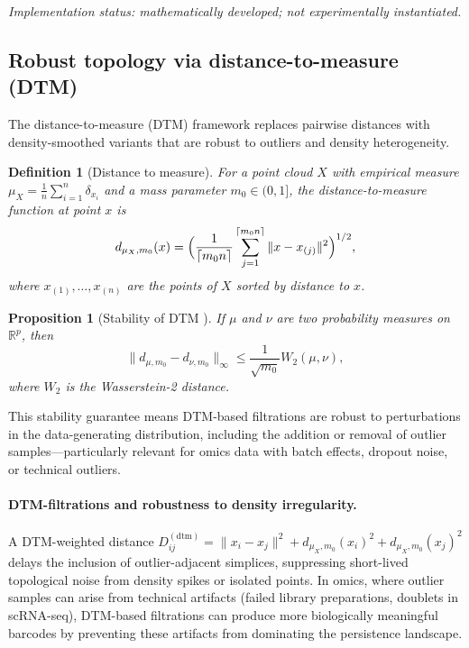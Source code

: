 \documentclass[11pt]{article}
\newtheorem{proposition}[theorem]{Proposition}
\newtheorem{definition}[theorem]{Definition}
\begin{document}
\emph{Implementation status: mathematically developed; not experimentally instantiated.}

\subsection{Robust topology via distance-to-measure (DTM)}
\label{sec:dtm}

The distance-to-measure (DTM) framework \cite{chazal2011dtm, chazal2017robust} replaces pairwise distances with density-smoothed variants that are robust to outliers and density heterogeneity.

\begin{definition}[Distance to measure]\label{def:dtm}
For a point cloud $X$ with empirical measure $\mu_X = \frac{1}{n}\sum_{i=1}^n \delta_{x_i}$ and a mass parameter $m_0 \in (0,1]$, the \emph{distance-to-measure function} at point $x$ is
\[
d_{\mu_X, m_0}(x) = \Bigl( \frac{1}{\lceil m_0 n \rceil} \sum_{j=1}^{\lceil m_0 n \rceil} \|x - x_{(j)}\|^2 \Bigr)^{1/2},
\]
where $x_{(1)}, \ldots, x_{(n)}$ are the points of $X$ sorted by distance to $x$.
\end{definition}

\begin{proposition}[Stability of DTM \cite{chazal2011dtm}]\label{prop:dtm}
If $\mu$ and $\nu$ are two probability measures on $\mathbb{R}^p$, then
\[
\|d_{\mu, m_0} - d_{\nu, m_0}\|_\infty \le \frac{1}{\sqrt{m_0}} W_2(\mu, \nu),
\]
where $W_2$ is the Wasserstein-2 distance.
\end{proposition}

This stability guarantee means DTM-based filtrations are robust to perturbations in the data-generating distribution, including the addition or removal of outlier samples---particularly relevant for omics data with batch effects, dropout noise, or technical outliers.

\paragraph{DTM-filtrations and robustness to density irregularity.}
A DTM-weighted distance $D^{(\text{dtm})}_{ij} = \|x_i - x_j\|^2 + d_{\mu_X, m_0}(x_i)^2 + d_{\mu_X, m_0}(x_j)^2$ delays the inclusion of outlier-adjacent simplices, suppressing short-lived topological noise from density spikes or isolated points.
In omics, where outlier samples can arise from technical artifacts (failed library preparations, doublets in scRNA-seq), DTM-based filtrations can produce more biologically meaningful barcodes by preventing these artifacts from dominating the persistence landscape.
\end{document}
